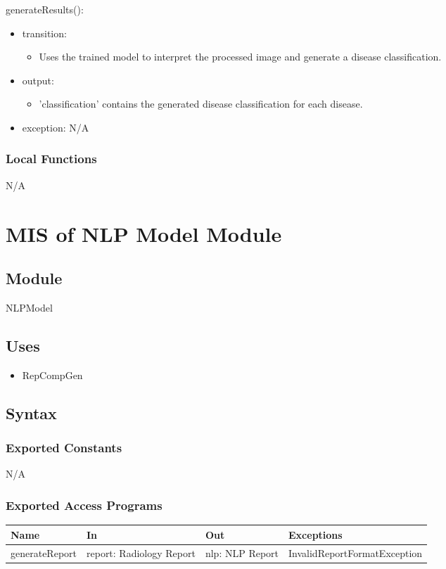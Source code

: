 \documentclass[12pt, titlepage]{article}
\begin{document}
\noindent generateResults():
\begin{itemize}
\item transition: \begin{itemize}
    \item Uses the trained model to interpret the processed image and generate a disease classification.
\end{itemize}
\item output: \begin{itemize}
    \item 'classification' contains the generated disease classification for each disease.
\end{itemize}
\item exception: N/A
\end{itemize}

\subsubsection{Local Functions}
N/A
\newpage

\section{MIS of NLP Model Module} \label{Module} 
\subsection{Module}
NLPModel
\subsection{Uses}
\begin{itemize}
    \item RepCompGen
\end{itemize}
\subsection{Syntax}

\subsubsection{Exported Constants}
N/A
\subsubsection{Exported Access Programs}

\begin{center}
\begin{tabular}{p{3cm} p{4cm} p{4cm} p{5cm}}
\hline
\textbf{Name} & \textbf{In} & \textbf{Out} & \textbf{Exceptions} \\
\hline
generateReport & report: Radiology Report & nlp: NLP Report & InvalidReportFormatException \\
\hline
\end{tabular}
\end{center}
\end{document}
